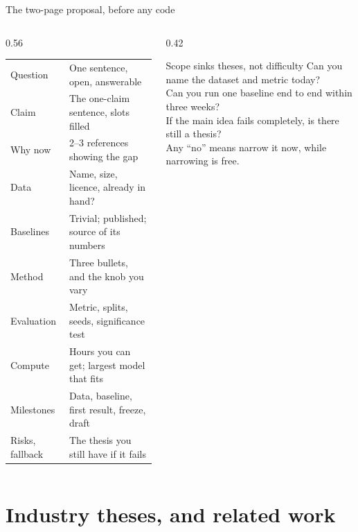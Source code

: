 \documentclass[aspectratio=169,11pt]{beamer}
\begin{document}
\begin{frame}{The two-page proposal, before any code}
\begin{columns}[T]
\begin{column}{0.56\textwidth}
\footnotesize
\begin{tabularx}{\linewidth}{>{\raggedright\arraybackslash}p{2.2cm} X}
\toprule
\rowcolor{rowtint} Question & One sentence, open, answerable \\
Claim & The one-claim sentence, slots filled \\
\rowcolor{rowtint} Why now & 2--3 references showing the gap \\
Data & Name, size, licence, already in hand? \\
\rowcolor{rowtint} Baselines & Trivial; published; source of its numbers \\
Method & Three bullets, and the knob you vary \\
\rowcolor{rowtint} Evaluation & Metric, splits, seeds, significance test \\
Compute & Hours you can get; largest model that fits \\
\rowcolor{rowtint} Milestones & Data, baseline, first result, freeze, draft \\
Risks, fallback & The thesis you still have if it fails \\
\bottomrule
\end{tabularx}
\end{column}
\begin{column}{0.42\textwidth}
\begin{alertblock}{Scope sinks theses, not difficulty}
\footnotesize
Can you name the dataset and metric today?\\[3pt]
Can you run one baseline end to end within three weeks?\\[3pt]
If the main idea fails completely, is there still a thesis?\\[4pt]
Any ``no'' means narrow it now, while narrowing is free.
\end{alertblock}
\end{column}
\end{columns}
\end{frame}

\section{Industry theses, and related work}
\end{document}
